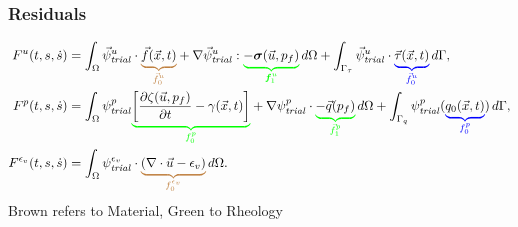 \documentclass[aspectratio=169,hyperref=colorlinks]{beamer}
\begin{document}
\begin{frame}
  \frametitle{Residuals}
  {\small
  \begin{align*}
  F^u(t,s,\dot{s}) &= \int_\Omega \trialvec[u] \cdot \eqnannotatemat{\vec{f}(\vec{x},t)}{\vec{f}^u_0}
                     + \nabla \trialvec[u] : \eqnannotaterhe{-\tensor{\sigma}(\vec{u},p_f)}{\tensor{f}^u_1} \, d\Omega
                     + \int_{\Gamma_\tau} \trialvec[u] \cdot \eqnannotate{\vec{\tau}(\vec{x},t)}{\vec{f}^u_0} \, d\Gamma, \\
  F^p(t,s,\dot{s}) &= \int_\Omega  \trialscalar[p] \eqnannotaterhe{\left[\frac{\partial \zeta(\vec{u},p_f)}{\partial t} - \gamma(\vec{x},t) \right]}{f^p_0}
                     + \nabla \trialscalar[p] \cdot \eqnannotaterhe{-\vec{q}(p_f)}{\vec{f}^p_1} \, d\Omega
                     + \int_{\Gamma_q} \trialscalar[p] (\eqnannotate{q_0(\vec{x},t)}{f^p_0}) \, d\Gamma, \\
  F^{\epsilon_{v}}(t,s,\dot{s}) &= \int_{\Omega} \trialscalar[\epsilon_{v}] \cdot \eqnannotatemat{\left(\nabla \cdot \vec{u} - \epsilon_{v} \right)}{f^{\epsilon_{v}}_{0}} \, d\Omega. 
\end{align*}}
Brown refers to Material, Green to Rheology

\end{frame}
\end{document}
